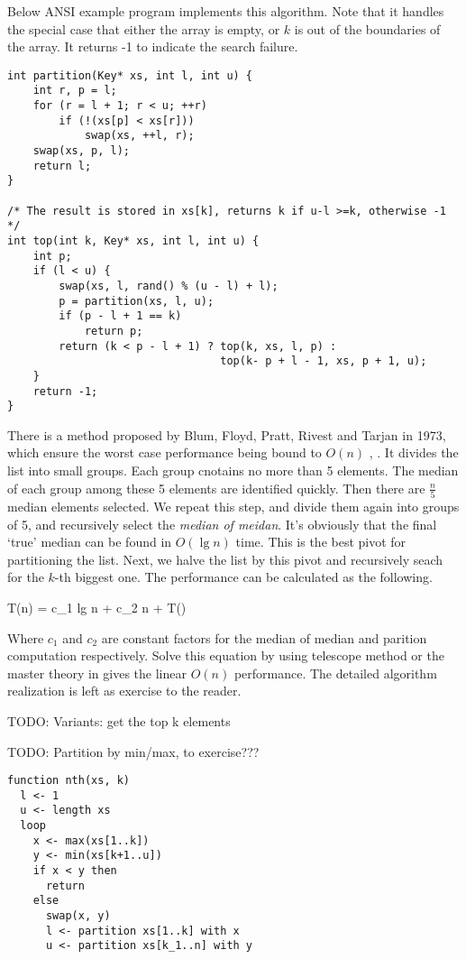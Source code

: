 \documentclass{article}
\begin{document}
Below ANSI example program implements this algorithm. Note that it handles the special case that
either the array is empty, or $k$ is out of the boundaries of the array. It returns -1 to indicate
the search failure.

\lstset{language=C}
\begin{lstlisting}
int partition(Key* xs, int l, int u) {
    int r, p = l;
    for (r = l + 1; r < u; ++r)
        if (!(xs[p] < xs[r]))
            swap(xs, ++l, r);
    swap(xs, p, l);
    return l;
}

/* The result is stored in xs[k], returns k if u-l >=k, otherwise -1 */
int top(int k, Key* xs, int l, int u) {
    int p;
    if (l < u) {
        swap(xs, l, rand() % (u - l) + l);
        p = partition(xs, l, u);
        if (p - l + 1 == k) 
            return p;
        return (k < p - l + 1) ? top(k, xs, l, p) : 
                                 top(k- p + l - 1, xs, p + 1, u);
    }
    return -1;
}
\end{lstlisting}

There is a method proposed by Blum, Floyd, Pratt, Rivest and Tarjan in 1973, which ensure the worst case performance
being bound to $O(n)$ \cite{CLRS}, \cite{median-of-median}. It divides the list into small groups. Each group cnotains
no more than 5 elements. The median of each group among these 5 elements are identified quickly. Then there are $\frac{n}{5}$
median elements selected. We repeat this step, and divide them again into groups of 5, and recursively select the
{\em median of meidan}. It's obviously that the final `true' median can be found in $O(\lg n)$ time. This is the 
best pivot for partitioning the list. Next, we halve the list by this pivot and recursively seach for the $k$-th
biggest one. The performance can be calculated as the following.

\be
T(n) = c_1 lg n + c_2 n + T()
\ee

Where $c_1$ and $c_2$ are constant factors for the median of median and parition computation respectively. Solve this
equation by using telescope method or the master theory in \cite{CLRS} gives the linear $O(n)$ performance. The detailed
algorithm realization is left as exercise to the reader.

TODO: Variants: get the top k elements

TODO: Partition by min/max, to exercise???

\begin{verbatim}
function nth(xs, k)
  l <- 1
  u <- length xs
  loop
    x <- max(xs[1..k])
    y <- min(xs[k+1..u])
    if x < y then
      return
    else
      swap(x, y)
      l <- partition xs[1..k] with x
      u <- partition xs[k_1..n] with y 
\end{verbatim}
\end{document}
